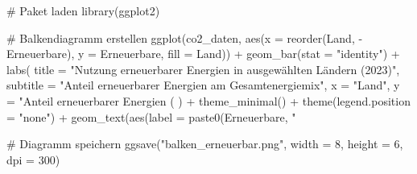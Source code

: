 # Paket laden
library(ggplot2)

# Balkendiagramm erstellen
ggplot(co2_daten, aes(x = reorder(Land, -Erneuerbare), y = Erneuerbare, fill = Land)) +
  geom_bar(stat = "identity") +
  labs(
    title = "Nutzung erneuerbarer Energien in ausgewählten Ländern (2023)",
    subtitle = "Anteil erneuerbarer Energien am Gesamtenergiemix",
    x = "Land",
    y = "Anteil erneuerbarer Energien (%
  ) +
  theme_minimal() +
  theme(legend.position = "none") +
  geom_text(aes(label = paste0(Erneuerbare, "%

# Diagramm speichern
ggsave("balken_erneuerbar.png", width = 8, height = 6, dpi = 300)